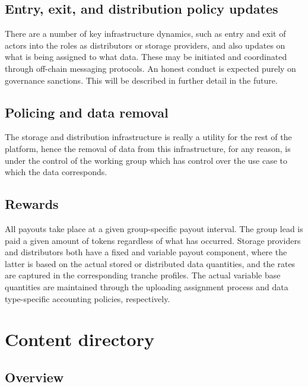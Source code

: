 \documentclass{article}
\begin{document}
\subsection{Entry, exit, and distribution policy updates}

There are a number of key infrastructure dynamics, such as entry and exit of actors into the roles as distributors or storage providers, and also updates on what is being assigned to what data. These may be initiated and coordinated through off-chain messaging protocols. An honest conduct is expected purely on governance sanctions. This will be described in further detail in the future.

\subsection{Policing and data removal}

The storage and distribution infrastructure is really a utility for the rest of the platform, hence the removal of data from this infrastructure, for any reason, is under the control of the working group which has control over the use case to which the data corresponds.

\subsection{Rewards}

All payouts take place at a given group-specific payout interval.
The group lead is paid a given amount of tokens regardless of what has occurred. Storage providers and distributors both have a fixed and variable payout component, where the latter is based on the actual stored or distributed data quantities, and the rates are captured in the corresponding tranche profiles. The actual variable base quantities are maintained through the uploading assignment process and data type-specific accounting policies, respectively.


\section{Content directory} \label{sec:content_directory}

\subsection{Overview}
\end{document}
